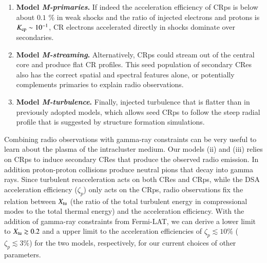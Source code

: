 \documentclass[a4paper,fleqn,usenatbib]{mnras}
\begin{document}
\begin{enumerate}
\item {\bf Model {\em M-primaries}.} If indeed the acceleration
  efficiency of CRps is below about $0.1$ {\%} in weak shocks and the
  ratio of injected electrons and protons is $K_{{\mathrm{ep}}} \sim
  10^{-1}$, CR electrons accelerated directly in shocks dominate over
  secondaries.
\item {\bf Model {\em M-streaming}.} Alternatively, CRps could stream
  out of the central core and produce flat CR profiles. This seed
  population of secondary CRes also has the correct spatial and
  spectral features alone, or potentially complements primaries to
  explain radio observations.
\item {\bf Model {\em M-turbulence}.}  Finally, injected turbulence
  that is flatter than in previously adopted models, which allows seed
  CRps to follow the steep radial profile that is suggested by
  structure formation simulations.
\end{enumerate}

Combining radio observations with gamma-ray constraints can be very
useful to learn about the plasma of the intracluster medium. Our
models (ii) and (iii) relies on CRps to induce secondary CRes that
produce the observed radio emission. In addition proton-proton
collisions produce neutral pions that decay into gamma rays. Since
turbulent reacceleration acts on both CRes and CRps, while the DSA
acceleration efficiency ($\zeta_p$) only acts on the CRps, radio
observations fix the relation between $X_{\mathrm{tu}}$ (the ratio of the
total turbulent energy in compressional modes to the total thermal
energy) and the acceleration efficiency. With the addition of
gamma-ray constraints from Fermi-LAT, we can derive a lower limit to
$X_{\mathrm{tu}}\gtrsim0.2$ and a upper limit to the acceleration
efficiencies of $\zeta_p\lesssim 10\%$ ($\zeta_p\lesssim 3\%$) for
the two models, respectively, for our current choices of other
parameters.
\end{document}
